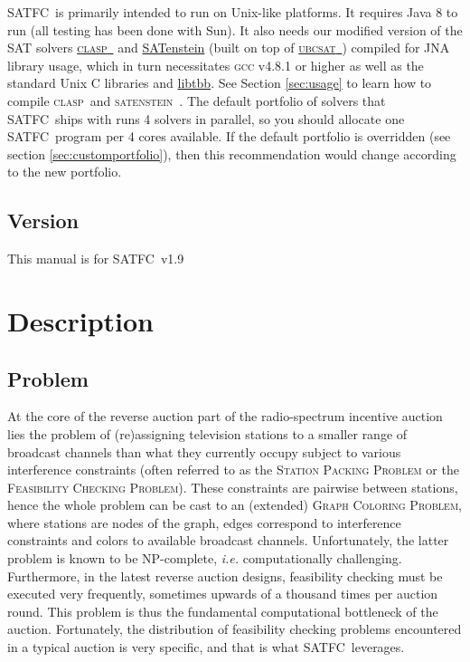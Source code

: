 \documentclass[
10pt, %
letterpaper, %
oneside, %
headinclude,footinclude, %
BCOR5mm, %
needspace, %
]{scrartcl}
\newcommand{\SATFC}{\textsc{SATFC}~}
\newcommand{\clasp}{\textsc{clasp}~}
\newcommand{\ubcsat}{\textsc{ubcsat}~}
\newcommand{\satenstein}{\textsc{satenstein}~}
\newcommand{\SATFCVersion}{v1.9~}
\begin{document}
\SATFC is primarily intended to run on Unix-like platforms. It requires Java 8 to run (all testing has been done with Sun). It also needs our modified version of the SAT solvers \href{http://potassco.sourceforge.net/}{\clasp} and \href{http://www.cs.ubc.ca/labs/beta/Projects/SATenstein/}{SATenstein} (built on top of \href{http://ubcsat.dtompkins.com/}{\ubcsat}) compiled for JNA library usage, which in turn necessitates \textsc{gcc} v4.8.1 or higher as well as the standard Unix C libraries and \href{https://www.threadingbuildingblocks.org/}{libtbb}. See Section \ref{sec:usage} to learn how to compile \clasp and \satenstein. The default portfolio of solvers that \SATFC ships with runs 4 solvers in parallel, so you should allocate one \SATFC program per 4 cores available. If the default portfolio is overridden (see section \ref{sec:customportfolio}), then this recommendation would change according to the new portfolio.

\subsection{Version}
This manual is for \SATFC \SATFCVersion

\section{Description}

\subsection{Problem}
At the core of the reverse auction part of the radio-spectrum incentive auction lies the problem of (re)assigning television stations to a smaller range of broadcast channels than what they currently occupy subject to various interference constraints (often referred to as the \textsc{Station Packing Problem} or the \textsc{Feasibility Checking Problem}). These constraints are pairwise between stations, hence the whole problem can be cast to an (extended) \textsc{Graph Coloring Problem}, where stations are nodes of the graph, edges correspond to interference constraints and colors to available broadcast channels. Unfortunately, the latter problem is known to be {NP}-complete, \emph{i.e.} computationally challenging. Furthermore, in the latest reverse auction designs, feasibility checking must be executed very frequently, sometimes upwards of a thousand times per auction round. This problem is thus the fundamental computational bottleneck of the auction. Fortunately, the distribution of feasibility checking problems encountered in a typical auction is very specific, and that is what \SATFC leverages.
\end{document}
